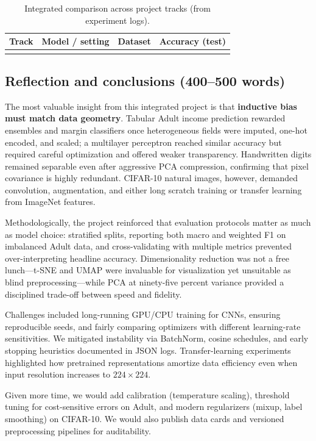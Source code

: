 \documentclass[11pt,a4paper]{article}
\begin{document}
\begin{table}[htbp]
\centering
\caption{Integrated comparison across project tracks (from experiment logs).}
\label{tab:final-compare}
\begin{tabular}{@{}llcc@{}}
\toprule
Track & Model / setting & Dataset & Accuracy (test) \\
\midrule
 \\
\bottomrule
\end{tabular}
\end{table}

\subsection{Reflection and conclusions (400--500 words)}
The most valuable insight from this integrated project is that \textbf{inductive bias must match data geometry}.
Tabular Adult income prediction rewarded ensembles and margin classifiers once heterogeneous fields were imputed, one-hot encoded, and scaled; a multilayer perceptron reached similar accuracy but required careful optimization and offered weaker transparency.
Handwritten digits remained separable even after aggressive PCA compression, confirming that pixel covariance is highly redundant.
CIFAR-10 natural images, however, demanded convolution, augmentation, and either long scratch training or transfer learning from ImageNet features.

Methodologically, the project reinforced that evaluation protocols matter as much as model choice: stratified splits, reporting both macro and weighted F1 on imbalanced Adult data, and cross-validating with multiple metrics prevented over-interpreting headline accuracy.
Dimensionality reduction was not a free lunch---t-SNE and UMAP were invaluable for visualization yet unsuitable as blind preprocessing---while PCA at ninety-five percent variance provided a disciplined trade-off between speed and fidelity.

Challenges included long-running GPU/CPU training for CNNs, ensuring reproducible seeds, and fairly comparing optimizers with different learning-rate sensitivities.
We mitigated instability via BatchNorm, cosine schedules, and early stopping heuristics documented in JSON logs.
Transfer-learning experiments highlighted how pretrained representations amortize data efficiency even when input resolution increases to $224\times224$.

Given more time, we would add calibration (temperature scaling), threshold tuning for cost-sensitive errors on Adult, and modern regularizers (mixup, label smoothing) on CIFAR-10.
We would also publish data cards and versioned preprocessing pipelines for auditability.
\end{document}
